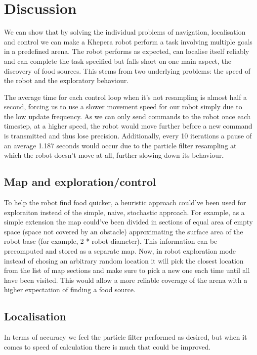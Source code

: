 \documentclass[paper=a4, fontsize=12pt]{scrartcl}	%
\numberwithin{equation}{section}		%
\numberwithin{figure}{section}			%
\numberwithin{table}{section}				%
\begin{document}
\section{Discussion}
We can show that by solving the individual problems of navigation, localisation and control we can make a Khepera robot perform a task involving multiple goals in a predefined arena. The robot performs as expected, can localise itself reliably and can complete the task specified but falls short on one main aspect, the discovery of food sources. This stems from two underlying problems: the speed of the robot and the exploratory behaviour.

The average time for each control loop when it's not resampling is almost half a second, forcing us to use a slower movement speed for our robot simply due to the low update frequency. As we can only send commands to the robot once each timestep, at a higher speed, the robot would move further before a new command is transmitted and thus lose precision. Additionally, every 10 iterations a pause of an average 1.187 seconds would occur due to the particle filter resampling at which the robot doesn't move at all, further slowing down its behaviour.

\subsection{Map and exploration/control}
To help the robot find food quicker, a heuristic approach could've been used for exploraiton instead of the simple, naive, stochastic approach. For example, as a simple extension the map could've been divided in sections of equal area of empty space (space not covered by an obstacle) approximating the surface area of the robot base (for example, 2 * robot diameter). This information can be precomputed and stored as a separate map. Now, in robot exploration mode instead of chosing an arbitrary random location it will pick the closest location from the list of map sections and make sure to pick a new one each time until all have been visited. This would allow a more reliable coverage of the arena with a higher expectation of finding a food source.

\subsection{Localisation}
In terms of accuracy we feel the particle filter performed as desired, but when it comes to speed of calculation there is much that could be improved.
\end{document}
